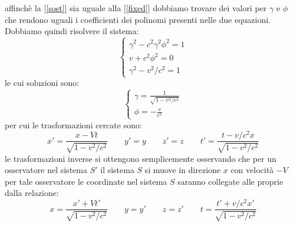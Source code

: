 \documentclass[a4paper,10pt,twoside]{article}
\begin{document}
affinchè la [\ref{sost}] sia uguale alla [\ref{fixed}] dobbiamo trovare dei valori per $\gamma$ e $\phi$ che rendono uguali i coefficienti dei polinomi presenti nelle due equazioni. Dobbiamo quindi risolvere il sistema:
\begin{equation}
\begin{cases}
\gamma^2-c^2\gamma^2\phi^2=1\\
v+c^2\phi^2=0\\
\gamma^2-v^2/c^2=1
\end{cases}
\end{equation}
le cui soluzioni sono:
\begin{equation}
 \begin{cases}
  \gamma=\frac{1}{\sqrt{1-v^2/c^2}}\\
  \phi=-\frac{v}{c^2}
 \end{cases}
\end{equation}
per cui le trasformazioni cercate sono:
\begin{equation}
x'=\frac{x-Vt}{\sqrt{1-v^2/c^2}}\qquad y'=y\qquad z'=z\qquad t'=\frac{t-v/c^2x}{\sqrt{1-v^2/c^2}}
\end{equation}
le trasformazioni inverse si ottengono semplicemente osservando che per un osservatore nel sistema $S'$ il sistema $S$ si muove in direzione $x$ con velocità $-V$ per tale osservatore le coordinate nel sistema $S$ saranno collegate alle proprie dalla relazione:
\begin{equation}
 x=\frac{x'+Vt'}{\sqrt{1-v^2/c^2}}\qquad y=y'\qquad z=z'\qquad t=\frac{t'+v/c^2x'}{\sqrt{1-v^2/c^2}}
\end{equation}
\end{document}
